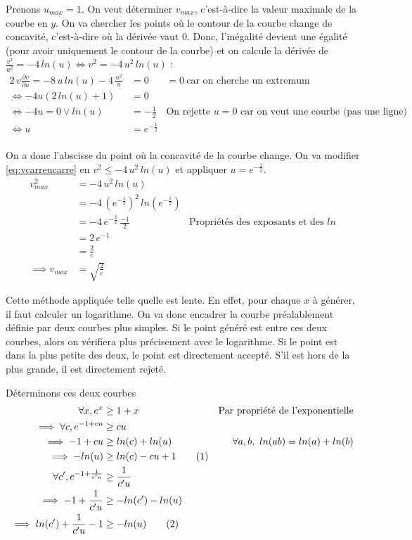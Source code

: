 Prenons $u_{max} = 1$. On veut déterminer $v_{max}$, c'est-à-dire la valeur maximale de la courbe en $y$. On va chercher les points où le contour de la courbe change de concavité, c'est-à-dire où la dérivée vaut $0$. Donc, l'inégalité devient une égalité (pour avoir uniquement le contour de la courbe) et on calcule la dérivée de $\frac{v^2}{u^2} = -4\,ln(u) \iff v^2 = -4\,u^2\,ln(u)$ :
\begin{align*}
    2\,v\frac{\partial v}{\partial u} = -8\,u\,ln(u) - 4\,\frac{u^2}{u} &= 0 & = 0\ \text{car on cherche un extremum}\\
    \iff -4u (2\,ln(u)+1) &= 0\\
    \iff -4u = 0 \vee ln(u) &= -\frac{1}{2} & \text{On rejette $u = 0$ car on veut une courbe (pas une ligne)}\\
    \iff u &= e^{-\frac{1}{2}}\\
\end{align*}

On a donc l'abscisse du point où la concavité de la courbe change. On va modifier \eqref{eq:vcarreucarre} en $v^2 \leq -4\,u^2\,ln(u)$ et appliquer $u=e^{-\frac{1}{2}}$.
\begin{align*}
    v_{max}^2 &= -4\,u^2\,ln(u)\\
    & = -4\,(e^{-\frac{1}{2}})^2\,ln(e^{-\frac{1}{2}})\\
    & = -4\,e^{-\frac{2}{2}}\,\frac{-1}{2} & \text{Propriétés des exposants et des $ln$}\\
    & = 2\,e^{-1}\\
    & = \frac{2}{e}\\
    \implies v_{max} &= \sqrt{\frac{2}{e}}
\end{align*}

Cette méthode appliquée telle quelle est lente. En effet, pour chaque $x$ à générer, il faut calculer un logarithme. On va donc encadrer la courbe préalablement définie par deux courbes plus simples. Si le point généré est entre ces deux courbes, alors on vérifiera plus précisement avec le logarithme. Si le point est dans la plus petite des deux, le point est directement accepté. S'il est hors de la plus grande, il est directement rejeté.

Déterminons ces deux courbes
\begin{align*}
    \forall x, e^x &\geq 1+x & \text{Par propriété de l'exponentielle}\\
    \implies \forall c, e^{-1+cu} &\geq cu\\
    \implies -1+cu &\geq ln(c)+ln(u) & \forall a,b,\ ln(ab) = ln(a)+ln(b)\\
    \implies -ln(u) &\geq ln(c)-cu+1\stepcounter{equation}\tag{\theequation}\label{lnu1}\\
    \forall c', e^{-1+\frac{1}{c'u}} &\geq \frac{1}{c'u}\\
    \implies -1 + \frac{1}{c'u} &\geq -ln(c')-ln(u)\\
    \implies ln(c') + \frac{1}{c'u} - 1 &\geq -ln(u)\stepcounter{equation}\tag{\theequation}\label{lnu2}\\
\end{align*}

